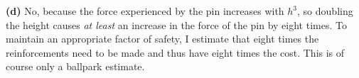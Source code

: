 \documentclass{article}
\begin{document}
\textbf{(d)} No, because the force experienced by the pin increases with $h^3$, so doubling the height causes \textit{at least} an increase in the force of the pin by eight times. To maintain an appropriate factor of safety, I estimate that eight times the reinforcements need to be made and thus have eight times the cost. This is of course only a ballpark estimate.
\end{document}

